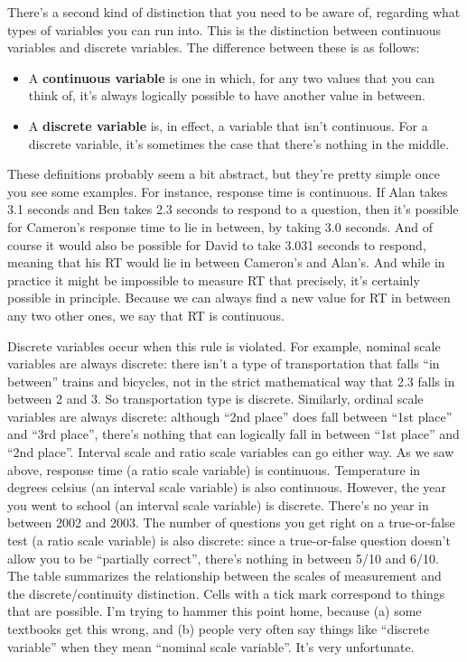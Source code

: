 \documentclass[
]{book}
\begin{document}
There's a second kind of distinction that you need to be aware of, regarding what types of variables you can run into. This is the distinction between continuous variables and discrete variables. The difference between these is as follows:

\begin{itemize}
\item
  A \textbf{continuous variable} is one in which, for any two values that you can think of, it's always logically possible to have another value in between.
\item
  A \textbf{discrete variable} is, in effect, a variable that isn't continuous. For a discrete variable, it's sometimes the case that there's nothing in the middle.
\end{itemize}

These definitions probably seem a bit abstract, but they're pretty simple once you see some examples. For instance, response time is continuous. If Alan takes 3.1 seconds and Ben takes 2.3 seconds to respond to a question, then it's possible for Cameron's response time to lie in between, by taking 3.0 seconds. And of course it would also be possible for David to take 3.031 seconds to respond, meaning that his RT would lie in between Cameron's and Alan's. And while in practice it might be impossible to measure RT that precisely, it's certainly possible in principle. Because we can always find a new value for RT in between any two other ones, we say that RT is continuous.

Discrete variables occur when this rule is violated. For example, nominal scale variables are always discrete: there isn't a type of transportation that falls ``in between'' trains and bicycles, not in the strict mathematical way that 2.3 falls in between 2 and 3. So transportation type is discrete. Similarly, ordinal scale variables are always discrete: although ``2nd place'' does fall between ``1st place'' and ``3rd place'', there's nothing that can logically fall in between ``1st place'' and ``2nd place''. Interval scale and ratio scale variables can go either way. As we saw above, response time (a ratio scale variable) is continuous. Temperature in degrees celsius (an interval scale variable) is also continuous. However, the year you went to school (an interval scale variable) is discrete. There's no year in between 2002 and 2003. The number of questions you get right on a true-or-false test (a ratio scale variable) is also discrete: since a true-or-false question doesn't allow you to be ``partially correct'', there's nothing in between 5/10 and 6/10. The table summarizes the relationship between the scales of measurement and the discrete/continuity distinction. Cells with a tick mark correspond to things that are possible. I'm trying to hammer this point home, because (a) some textbooks get this wrong, and (b) people very often say things like ``discrete variable'' when they mean ``nominal scale variable''. It's very unfortunate.
\end{document}
